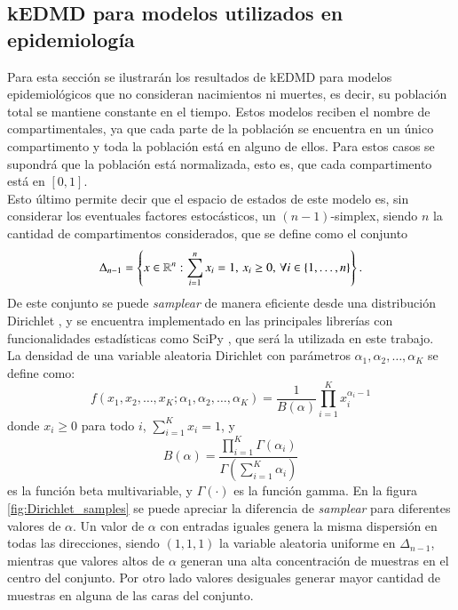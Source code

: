 \subsection{kEDMD para modelos utilizados en epidemiología}
Para esta sección se ilustrarán los resultados de kEDMD para modelos epidemiológicos que no consideran nacimientos ni muertes, es decir, su población total se mantiene constante en el tiempo. Estos modelos reciben el nombre de compartimentales, ya que cada parte de la población se encuentra en un único compartimento y toda la población está en alguno de ellos. Para estos casos se supondrá que la población está normalizada, esto es, que cada compartimento está en $[0, 1]$.\\
Esto último permite decir que el espacio de estados de este modelo es, sin considerar los eventuales factores estocásticos, un $(n-1)$-simplex, siendo $n$ la cantidad de compartimentos considerados, que se define como el conjunto
\begin{equation*}
    \Delta_{n-1} = \left \{ x \in \mathbb{R}^n : \sum_{i=1}^n x_i = 1, \, x_i \geq 0, \, \forall i \in \{1, \dots, n\} \right \}.
\end{equation*}
De este conjunto se puede \textit{samplear} de manera eficiente desde una distribución Dirichlet \cite{Frigyik2010IntroductionProcesses}, y se encuentra implementado en las principales librerías con funcionalidades estadísticas como SciPy \cite{Virtanen2020SciPyPython}, que será la utilizada en este trabajo.\\
La densidad de una variable aleatoria Dirichlet con parámetros $\alpha_1, \alpha_2, \ldots, \alpha_K$ se define como:
\[
f(x_1, x_2, \ldots, x_K; \alpha_1, \alpha_2, \ldots, \alpha_K) = \frac{1}{B(\alpha)} \prod_{i=1}^{K} x_i^{\alpha_i - 1}
\]
donde $x_i \geq 0$ para todo $i$, $\sum_{i=1}^{K} x_i = 1$, y
\[
B(\alpha) = \frac{\prod_{i=1}^{K} \Gamma(\alpha_i)}{\Gamma\left(\sum_{i=1}^{K} \alpha_i\right)}
\]
es la función beta multivariable, y $\Gamma(\cdot)$ es la función gamma. En la figura \ref{fig:Dirichlet_samples} se puede apreciar la diferencia de \textit{samplear} para diferentes valores de $\alpha$. Un valor de $\alpha$ con entradas iguales genera la misma dispersión en todas las direcciones, siendo $(1, 1, 1)$ la variable aleatoria uniforme en $\Delta_{n-1}$, mientras que valores altos de $\alpha$ generan una alta concentración de muestras en el centro del conjunto. Por otro lado valores desiguales generar mayor cantidad de muestras en alguna de las caras del conjunto.
